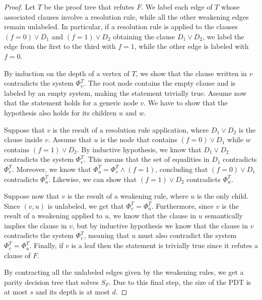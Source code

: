 \begin{proof}
 Let $T$ be the proof tree that refutes $F$. We label each edge of $T$ whose associated clauses involve a resolution rule, while all the other weakening edges remain unlabeled. In particular, if a resolution rule is applied to the clauses $(f = 0) \lor D_1$ and $(f = 1) \lor D_2$ obtaining the clause $D_1 \lor D_2$, we label the edge from the first to the third with $f = 1$, while the other edge is labeled with $f = 0$.

 By induction on the depth of a vertex of $T$, we show that the clause written in $v$ contradicts the system $\Phi_v^T$. The root node contains the empty clause and is labeled by an empty system, making the statement trivially true. Assume now that the statement holds for a generic node $v$. We have to show that the hypothesis also holds for its children $u$ and $w$.

 Suppose that $v$ is the result of a resolution rule application, where $D_1 \lor D_2$ is the clause inside $v$. Assume that $u$ is the node that contains $(f = 0) \lor D_1$ while $w$ contains $(f = 1) \lor D_2$. By inductive hypothesis, we know that $D_1 \lor D_2$ contradicts the system $\Phi_v^T$. This means that the set of equalities in $D_1$ contradicts $\Phi_v^T$. Moreover, we know that $\Phi_u^T = \Phi_v^T \land (f = 1)$, concluding that $(f = 0) \lor D_1$ contradicts $\Phi_u^T$. Likewise, we can show that $(f = 1) \lor D_2$ contradicts $\Phi_w^T$.
    
 Suppose now that $v$ is the result of a weakening rule, where $u$ is the only child. Since $(v,u)$ is unlabeled, we get that $\Phi_v^T = \Phi_u^T$. Furthermore, since $v$ is the result of a weakening applied to $u$, we know that the clause in $u$ semantically implies the clause in $v$, but by inductive hypothesis we know that the clause in $v$ contradicts the system $\Phi_v^T$, meaning that $u$ must also contradict the system $\Phi_v^T = \Phi_u^T$. Finally, if $v$ is a leaf then the statement is trivially true since it refutes a clause of $F$.

 By contracting all the unlabeled edges given by the weakening rules, we get a parity decision tree that solves $S_F$. Due to this final step, the size of the PDT is at most $s$ and its depth is at most $d$. 
\end{proof}

